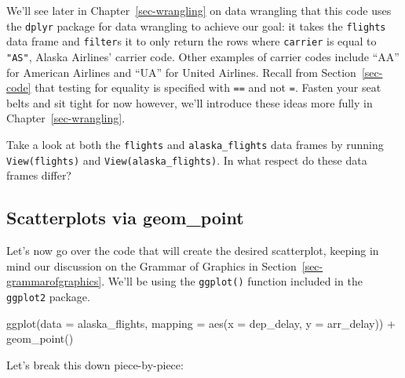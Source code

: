 \documentclass[
  letterpaper,
  DIV=11,
  numbers=noendperiod]{scrreprt}
\newenvironment{Shaded}{\begin{snugshade}}{\end{snugshade}}
\newcommand{\AttributeTok}[1]{\textcolor[rgb]{0.40,0.45,0.13}{#1}}
\newcommand{\FunctionTok}[1]{\textcolor[rgb]{0.28,0.35,0.67}{#1}}
\newcommand{\NormalTok}[1]{\textcolor[rgb]{0.00,0.23,0.31}{#1}}
\newcommand{\SpecialCharTok}[1]{\textcolor[rgb]{0.37,0.37,0.37}{#1}}
\theoremstyle{definition}
\theoremstyle{remark}
\begin{document}
We'll see later in Chapter~\ref{sec-wrangling} on data wrangling that
this code uses the \texttt{dplyr} package for data wrangling to achieve
our goal: it takes the \texttt{flights} data frame and \texttt{filter}s
it to only return the rows where \texttt{carrier} is equal to
\texttt{"AS"}, Alaska Airlines' carrier code. Other examples of carrier
codes include ``AA'' for American Airlines and ``UA'' for United
Airlines. Recall from Section~\ref{sec-code} that testing for equality
is specified with \texttt{==} and not \texttt{=}. Fasten your seat belts
and sit tight for now however, we'll introduce these ideas more fully in
Chapter~\ref{sec-wrangling}.

\begin{tcolorbox}[enhanced jigsaw, coltitle=black, toprule=.15mm, bottomtitle=1mm, breakable, leftrule=.75mm, title={{🎯} Learning Check 2.1}, opacitybacktitle=0.6, colback=white, rightrule=.15mm, opacityback=0, toptitle=1mm, colbacktitle=quarto-callout-tip-color!10!white, colframe=quarto-callout-tip-color-frame, titlerule=0mm, arc=.35mm, bottomrule=.15mm, left=2mm]
Take a look at both the \texttt{flights} and \texttt{alaska\_flights}
data frames by running \texttt{View(flights)} and
\texttt{View(alaska\_flights)}. In what respect do these data frames
differ?
\end{tcolorbox}

\hypertarget{sec-geompoint}{%
\subsection{Scatterplots via geom\_point}\label{sec-geompoint}}

Let's now go over the code that will create the desired scatterplot,
keeping in mind our discussion on the Grammar of Graphics in
Section~\ref{sec-grammarofgraphics}. We'll be using the
\texttt{ggplot()} function included in the \texttt{ggplot2} package.

\begin{Shaded}
\begin{Highlighting}[]
\FunctionTok{ggplot}\NormalTok{(}\AttributeTok{data =}\NormalTok{ alaska\_flights, }\AttributeTok{mapping =} \FunctionTok{aes}\NormalTok{(}\AttributeTok{x =}\NormalTok{ dep\_delay, }\AttributeTok{y =}\NormalTok{ arr\_delay)) }\SpecialCharTok{+} 
  \FunctionTok{geom\_point}\NormalTok{()}
\end{Highlighting}
\end{Shaded}

Let's break this down piece-by-piece:
\end{document}
